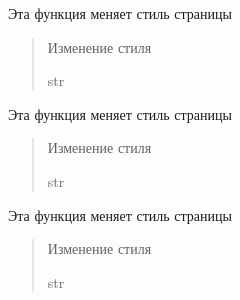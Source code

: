 \documentclass[letterpaper,10pt,russian]{sphinxmanual}
\begin{document}
\begin{fulllineitems}
\label{\detokenize{blueprints:blueprints.style.style1}}
\pysigstartsignatures
{}
\pysigstopsignatures
\sphinxAtStartPar
Эта функция меняет стиль страницы
\begin{quote}\begin{description}
\sphinxAtStartPar
Изменение стиля

\sphinxAtStartPar
str

\end{description}\end{quote}

\end{fulllineitems}


\begin{fulllineitems}
\label{\detokenize{blueprints:blueprints.style.style2}}
\pysigstartsignatures
{}
\pysigstopsignatures
\sphinxAtStartPar
Эта функция меняет стиль страницы
\begin{quote}\begin{description}
\sphinxAtStartPar
Изменение стиля

\sphinxAtStartPar
str

\end{description}\end{quote}

\end{fulllineitems}


\begin{fulllineitems}
\label{\detokenize{blueprints:blueprints.style.style3}}
\pysigstartsignatures
{}
\pysigstopsignatures
\sphinxAtStartPar
Эта функция меняет стиль страницы
\begin{quote}\begin{description}
\sphinxAtStartPar
Изменение стиля

\sphinxAtStartPar
str

\end{description}\end{quote}

\end{fulllineitems}
\end{document}
